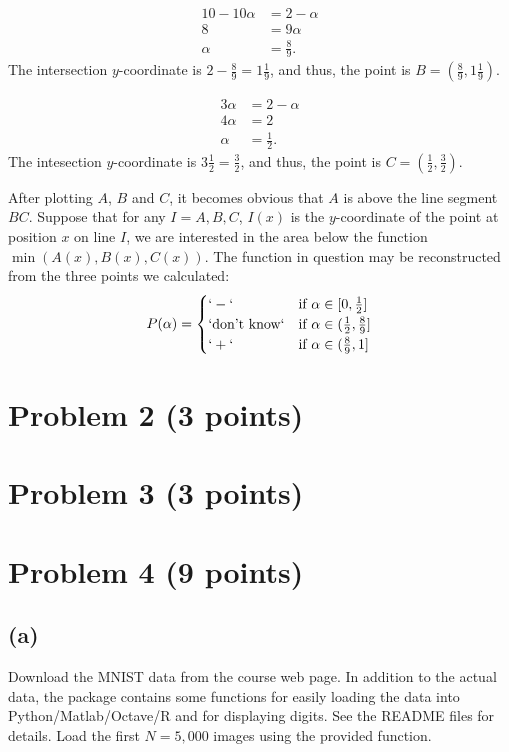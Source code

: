 \documentclass[10pt]{article}
\begin{document}
\begin{align*}
10 - 10\alpha &= 2 - \alpha \\
8 &= 9 \alpha \\
\alpha &= \frac{8}{9}.
\end{align*}
The intersection $y$-coordinate is $2 - \frac{8}{9} = 1\frac{1}{9}$, and thus, the point is $B = (\frac{8}{9}, 1\frac{1}{9})$.

\begin{align*}
3\alpha &= 2 - \alpha \\
4\alpha &= 2 \\
\alpha &= \frac{1}{2}.
\end{align*}
The intesection $y$-coordinate is $3 \frac{1}{2} = \frac{3}{2}$, and thus, the point is $C = (\frac{1}{2}, \frac{3}{2})$.

After plotting $A$, $B$ and $C$, it becomes obvious that $A$ is above the line segment $BC$. Suppose that for any $I = A, B, C$, $I(x)$ is the $y$-coordinate of the point at position $x$ on line $I$, we are interested in the area below the function $\min (A(x), B(x), C(x))$. The function in question may be reconstructed from the three points we calculated:
\[
P(\alpha) = 
\begin{cases}
`-` & \text{if } \alpha \in [0, \frac{1}{2}] \\
`\text{don't know}` & \text{if } \alpha \in (\frac{1}{2}, \frac{8}{9}] \\
`+` & \text{if } \alpha \in (\frac{8}{9}, 1] \\
\end{cases}
\]
\section*{Problem 2 (3 points)}

\section*{Problem 3 (3 points)}

\section*{Problem 4 (9 points)}
\subsection*{(a)}
\color{blue}
Download the MNIST data from the course web page. In addition to the actual data, the package contains some functions for easily loading the data into Python/Matlab/Octave/R and for displaying digits. See the README files for details. Load the first $N=5,000$ images using the provided function.
\color{black}
\end{document}
